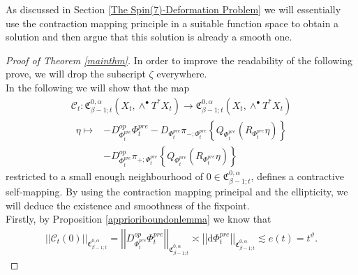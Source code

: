 \documentclass[psamsfonts]{amsart}
\theoremstyle{plain}
\theoremstyle{definition}{
\newtheorem{defi}{Definition}[section]
\newtheorem{ass}{Assumption}
\newtheorem*{nota}{Notation}}
\theoremstyle{remark}{
\newtheorem{rem}{Remark}
\newtheorem{ex}{Example}}
\theoremstyle{plain}{
\newtheorem{thm}{Theorem}[section]
\newtheorem{lem}{Lemma}[section]
\newtheorem{cor}{Corollary}[section]
\newtheorem{prop}{Proposition}[section]
\newtheorem{con}{Conjecture}[section]}
\newcommand{\m}[1]{{\mathrm{#1}}}
\begin{document}
As discussed in Section \ref{The Spin(7)-Deformation Problem} we will essentially use the contraction mapping principle in a suitable function space to obtain a solution and then argue that this solution is already a smooth one.


\begin{proof}[Proof of Theorem \ref{mainthm}]
In order to improve the readability of the following prove, we will drop the subscript $\zeta$ everywhere.\\

In the following we will show that the map
\begin{align*}
    \mathcal{C}_{t} \colon\mathfrak{C}^{0,\alpha}_{\beta-1;t}(X_{t},\wedge^\bullet T^*X_{t})\rightarrow\mathfrak{C}^{0,\alpha}_{\beta-1;t}(X_{t},\wedge^\bullet T^*X_{t})
\end{align*}
\begin{align*}
       \eta\mapsto &-D^{op}_{\Phi^{pre}_{t}}\Phi^{pre}_{t}-D_{\Phi_{t}^{pre}}\pi_{-;\Phi^{pre}_t}\left\{Q_{\Phi_{t}^{pre}}(R_{\Phi^{pre}_{t}}\eta)\right\}\\
       &-D^{op}_{\Phi_{t}^{pre}}\pi_{+;\Phi^{pre}_{t}}\left\{Q_{\Phi_{t}^{pre}}(R_{\Phi^{pre}_{t}}\eta)\right\}
\end{align*}
restricted to a small enough neighbourhood of $0\in\mathfrak{C}^{0,\alpha}_{\beta-1;t}$, defines a contractive self-mapping. By using the contraction  mapping principal and the ellipticity, we will deduce the existence and smoothness of the fixpoint.\\

Firstly, by Proposition \ref{apprioriboundonlemma} we know that 
\begin{align*}
    \left|\left|\mathcal{C}_{t}(0)\right|\right|_{\mathfrak{C}^{0,\alpha}_{\beta-1;t}}=\left|\left|D^{op}_{\Phi_{t}^{pre}}\Phi^{pre}_{t}\right|\right|_{\mathfrak{C}^{0,\alpha}_{\beta-1;t}}\asymp\left|\left|\m{d}\Phi^{pre}_{t}\right|\right|_{\mathfrak{C}^{0,\alpha}_{\beta-1;t}}\lesssim e(t)=t^\vartheta.
\end{align*}


\end{proof}
\end{document}
